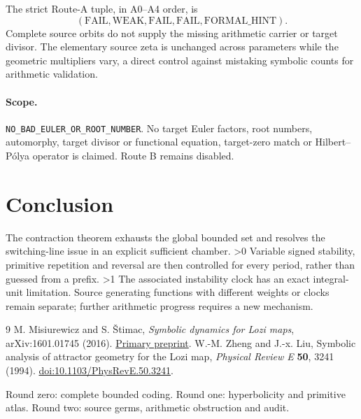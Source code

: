 \documentclass[10pt]{article}
\begin{document}
The strict Route-A tuple, in A0--A4 order, is
\[
(\mathrm{FAIL},\mathrm{WEAK},\mathrm{FAIL},\mathrm{FAIL},\mathrm{FORMAL\_HINT}).
\]
Complete source orbits do not supply the missing arithmetic
carrier or target divisor. The elementary source zeta is unchanged across
parameters while the geometric multipliers vary, a direct control against
mistaking symbolic counts for arithmetic validation.
\begin{samepage}
\paragraph{Scope.}
\texttt{NO\_BAD\_EULER\_OR\_ROOT\_NUMBER}.
No target Euler factors, root numbers, automorphy, target divisor or
functional equation, target-zero match or Hilbert--Pólya operator is claimed.
Route B remains disabled.
\end{samepage}
\fi

\section{Conclusion}
The contraction theorem exhausts the global bounded set and resolves the
switching-line issue in an explicit sufficient chamber.
\ifnum\CRevisionRound>0
Variable signed stability, primitive repetition and reversal are then
controlled for every period, rather than guessed from a prefix.
\fi
\ifnum\CRevisionRound>1
The associated instability clock has an exact integral-unit limitation.
Source generating functions with different weights or clocks remain
separate; further arithmetic progress requires a new mechanism.
\fi

\begin{thebibliography}{9}
M. Misiurewicz and S. Štimac,
\emph{Symbolic dynamics for Lozi maps},
arXiv:1601.01745 (2016).
\href{https://arxiv.org/abs/1601.01745}{Primary preprint}.
W.-M. Zheng and J.-x. Liu,
Symbolic analysis of attractor geometry for the Lozi map,
\emph{Physical Review E} \textbf{50}, 3241 (1994).
\href{https://doi.org/10.1103/PhysRevE.50.3241}{doi:10.1103/PhysRevE.50.3241}.
\end{thebibliography}
\noindent\small
\ifcase\CRevisionRound Round zero: complete bounded coding.
\or Round one: hyperbolicity and primitive atlas.
\else Round two: source germs, arithmetic obstruction and audit.\fi
\end{document}
